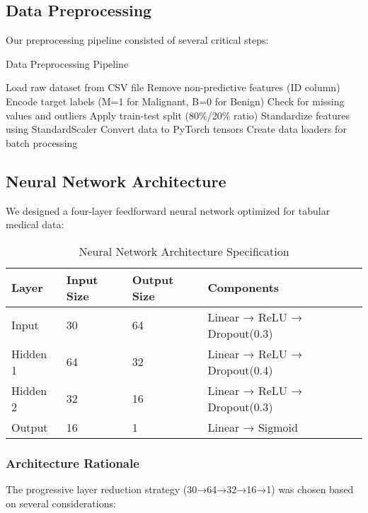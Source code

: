 \documentclass[12pt,a4paper]{article}
\begin{document}
\subsection{Data Preprocessing}

Our preprocessing pipeline consisted of several critical steps:

\begin{algorithm}
\caption{Data Preprocessing Pipeline}
\begin{algorithmic}[1]
\STATE Load raw dataset from CSV file
\STATE Remove non-predictive features (ID column)
\STATE Encode target labels (M=1 for Malignant, B=0 for Benign)
\STATE Check for missing values and outliers
\STATE Apply train-test split (80\%/20\% ratio)
\STATE Standardize features using StandardScaler
\STATE Convert data to PyTorch tensors
\STATE Create data loaders for batch processing
\end{algorithmic}
\end{algorithm}

\subsection{Neural Network Architecture}

We designed a four-layer feedforward neural network optimized for tabular medical data:

\begin{table}[H]
\centering
\caption{Neural Network Architecture Specification}
\label{tab:architecture}
\begin{tabular}{@{}llll@{}}
\toprule
\textbf{Layer} & \textbf{Input Size} & \textbf{Output Size} & \textbf{Components} \\
\midrule
Input & 30 & 64 & Linear → ReLU → Dropout(0.3) \\
Hidden 1 & 64 & 32 & Linear → ReLU → Dropout(0.4) \\
Hidden 2 & 32 & 16 & Linear → ReLU → Dropout(0.3) \\
Output & 16 & 1 & Linear → Sigmoid \\
\bottomrule
\end{tabular}
\end{table}

\subsubsection{Architecture Rationale}

The progressive layer reduction strategy (30→64→32→16→1) was chosen based on several considerations:
\end{document}
